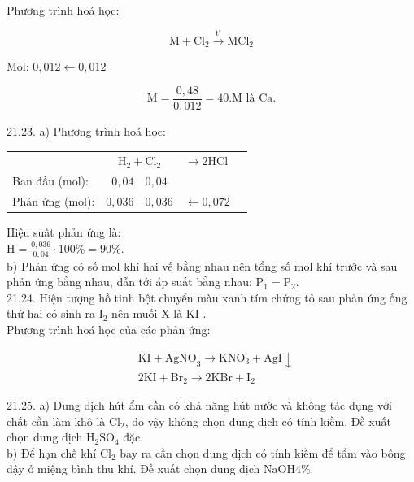 \documentclass[10pt]{article}
\begin{document}
Phương trình hoá học:

$$
\mathrm{M}+\mathrm{Cl}_{2} \xrightarrow{\mathrm{t}^{\circ}} \mathrm{MCl}_{2}
$$

Mol: $0,012 \leftarrow 0,012$

$$
\mathrm{M}=\frac{0,48}{0,012}=40 . \mathrm{M} \text { là } \mathrm{Ca} .
$$

21.23. a) Phương trình hoá học:

\begin{center}
\begin{tabular}{lcll}
 & $\mathrm{H}_{2}+\mathrm{Cl}_{2}$ & $\longrightarrow 2 \mathrm{HCl}$ \\
Ban đầu (mol): & $0,04 \quad 0,04$ &  \\
Phản ứng (mol): & $0,036 \quad 0,036$ & $\leftarrow 0,072$ \\
\end{tabular}
\end{center}

Hiệu suất phản ứng là:\\
$\mathrm{H}=\frac{0,036}{0,04} \cdot 100 \%=90 \%$.\\
b) Phản ứng có số mol khí hai vế bằng nhau nên tổng số mol khí trước và sau phản ứng bằng nhau, dẫn tới áp suất bằng nhau: $\mathrm{P}_{1}=\mathrm{P}_{2}$.\\
21.24. Hiện tượng hồ tinh bột chuyển màu xanh tím chứng tỏ sau phản ứng ống thứ hai có sinh ra $\mathrm{I}_{2}$ nên muối X là KI .\\
Phương trình hoá học của các phản ứng:

$$
\begin{aligned}
& \mathrm{KI}+\mathrm{AgNO}_{3} \longrightarrow \mathrm{KNO}_{3}+\mathrm{AgI} \downarrow \\
& 2 \mathrm{KI}+\mathrm{Br}_{2} \longrightarrow 2 \mathrm{KBr}+\mathrm{I}_{2}
\end{aligned}
$$

21.25. a) Dung dịch hút ẩm cần có khả năng hút nước và không tác dụng với chất cần làm khô là $\mathrm{Cl}_{2}$, do vậy không chọn dung dịch có tính kiềm. Đề xuất chọn dung dịch $\mathrm{H}_{2} \mathrm{SO}_{4}$ đặc.\\
b) Để hạn chế khí $\mathrm{Cl}_{2}$ bay ra cần chọn dung dịch có tính kiềm để tẩm vào bông đậy ở miệng bình thu khí. Đề xuất chọn dung dịch $\mathrm{NaOH} 4 \%$.
\end{document}
